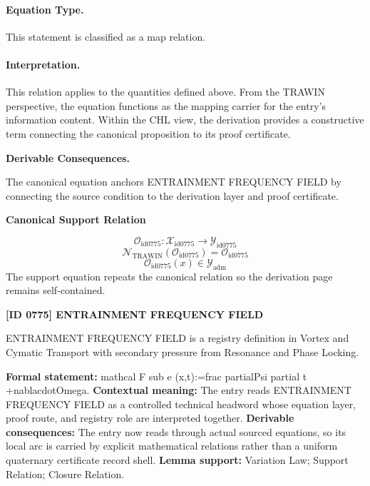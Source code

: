 \paragraph{Equation Type.}
This statement is classified as a map relation.

\paragraph{Interpretation.}
This relation applies to the quantities defined above. From the TRAWIN perspective, the equation functions as the mapping carrier for the entry’s information content. Within the CHL view, the derivation provides a constructive term connecting the canonical proposition to its proof certificate.

\par\vspace{0.35em}
\noindent\textbf{Derivable Consequences.}\quad
\begingroup
\footnotesize
\raggedright
The canonical equation anchors ENTRAINMENT FREQUENCY FIELD by connecting the source condition to the derivation layer and proof certificate.
\par\endgroup

\noindent\textbf{Canonical Support Relation}\par
\[
\mathcal{O}_{\mathrm{id0775}}:\mathcal{X}_{\mathrm{id0775}}\longrightarrow\mathcal{Y}_{\mathrm{id0775}}
\]
\[
\mathcal{N}_{\mathrm{TRAWIN}}(\mathcal{O}_{\mathrm{id0775}})=\mathcal{O}_{\mathrm{id0775}}
\]
\[
\mathcal{O}_{\mathrm{id0775}}(x)\in\mathcal{Y}_{\mathrm{adm}}
\]
\noindent The support equation repeats the canonical relation so the derivation page remains self-contained.\par

\clearpage
\noindent\textbf{[ID 0775] ENTRAINMENT FREQUENCY FIELD}\par
\vspace{0.35em}
\begingroup\small
{}
ENTRAINMENT FREQUENCY FIELD is a registry definition in Vortex and Cymatic Transport with secondary pressure from Resonance and Phase Locking.

\begingroup\footnotesize\setlength{\emergencystretch}{3em}\sloppy
\textbf{Formal statement:} mathcal F sub e (x,t):=frac partialPsi partial t +nablacdotOmega. \textbf{Contextual meaning:} The entry reads ENTRAINMENT FREQUENCY FIELD as a controlled technical headword whose equation layer, proof route, and registry role are interpreted together. \textbf{Derivable consequences:} The entry now reads through actual sourced equations, so its local arc is carried by explicit mathematical relations rather than a uniform quaternary certificate record shell. \textbf{Lemma support:} Variation Law; Support Relation; Closure Relation.\par
\endgroup

